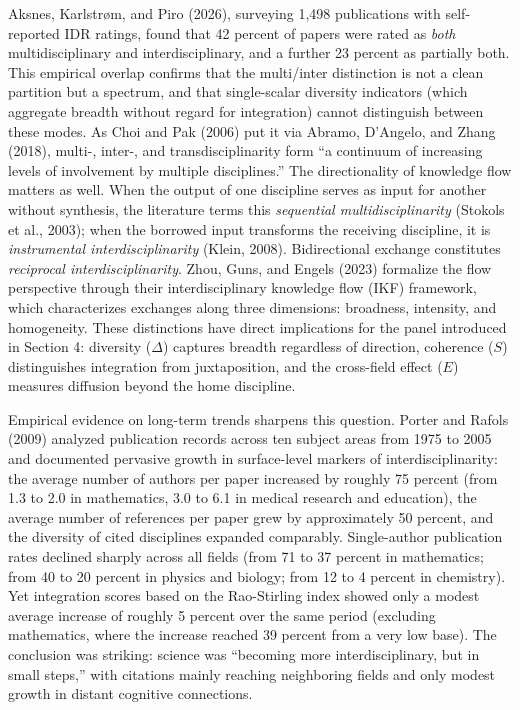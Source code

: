 \documentclass[
]{article}
\begin{document}
Aksnes, Karlstrøm, and Piro (2026), surveying 1,498 publications with
self-reported IDR ratings, found that 42 percent of papers were rated as
\emph{both} multidisciplinary and interdisciplinary, and a further 23
percent as partially both. This empirical overlap confirms that the
multi/inter distinction is not a clean partition but a spectrum, and
that single-scalar diversity indicators (which aggregate breadth without
regard for integration) cannot distinguish between these modes. As Choi
and Pak (2006) put it via Abramo, D'Angelo, and Zhang (2018), multi-,
inter-, and transdisciplinarity form ``a continuum of increasing levels
of involvement by multiple disciplines.'' The directionality of
knowledge flow matters as well. When the output of one discipline serves
as input for another without synthesis, the literature terms this
\emph{sequential multidisciplinarity} (Stokols et al., 2003); when the
borrowed input transforms the receiving discipline, it is
\emph{instrumental interdisciplinarity} (Klein, 2008). Bidirectional
exchange constitutes \emph{reciprocal interdisciplinarity}. Zhou, Guns,
and Engels (2023) formalize the flow perspective through their
interdisciplinary knowledge flow (IKF) framework, which characterizes
exchanges along three dimensions: broadness, intensity, and homogeneity.
These distinctions have direct implications for the panel introduced in
Section 4: diversity (\(\Delta\)) captures breadth regardless of
direction, coherence (\(S\)) distinguishes integration from
juxtaposition, and the cross-field effect (\(E\)) measures diffusion
beyond the home discipline.

Empirical evidence on long-term trends sharpens this question. Porter
and Rafols (2009) analyzed publication records across ten subject areas
from 1975 to 2005 and documented pervasive growth in surface-level
markers of interdisciplinarity: the average number of authors per paper
increased by roughly 75 percent (from 1.3 to 2.0 in mathematics, 3.0 to
6.1 in medical research and education), the average number of references
per paper grew by approximately 50 percent, and the diversity of cited
disciplines expanded comparably. Single-author publication rates
declined sharply across all fields (from 71 to 37 percent in
mathematics; from 40 to 20 percent in physics and biology; from 12 to 4
percent in chemistry). Yet integration scores based on the Rao-Stirling
index showed only a modest average increase of roughly 5 percent over
the same period (excluding mathematics, where the increase reached 39
percent from a very low base). The conclusion was striking: science was
``becoming more interdisciplinary, but in small steps,'' with citations
mainly reaching neighboring fields and only modest growth in distant
cognitive connections.
\end{document}
